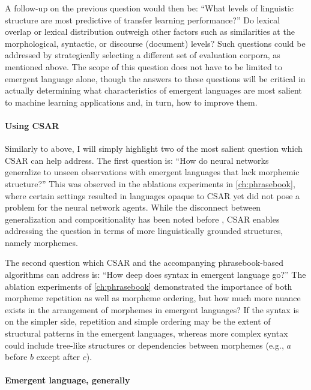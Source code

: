 A follow-up on the previous question would then be: ``What levels of linguistic structure are most predictive of transfer learning performance?''
Do lexical overlap or lexical distribution outweigh other factors such as similarities at the morphological, syntactic, or discourse (document) levels?
Such questions could be addressed by strategically selecting a different set of evaluation corpora, as mentioned above.
The scope of this question does not have to be limited to emergent language alone, though the answers to these questions will be critical in actually determining what characteristics of emergent languages are most salient to machine learning applications and, in turn, how to improve them.

\paragraph{Using CSAR}
Similarly to above, I will simply highlight two of the most salient question which CSAR can help address.
The first question is: ``How do neural networks generalize to unseen observations with emergent languages that lack morphemic structure?''
This was observed in the ablations experiments in \cref{ch:phrasebook}, where certain settings resulted in languages opaque to CSAR yet did not pose a problem for the neural network agents.
While the disconnect between generalization and compositionality has been noted before \citep{lake2018generalization}, CSAR enables addressing the question in terms of more linguistically grounded structures, namely morphemes.

The second question which CSAR and the accompanying phrasebook-based algorithms can address is: ``How deep does syntax in emergent language go?''
The ablation experiments of \cref{ch:phrasebook} demonstrated the importance of both morpheme repetition as well as morpheme ordering, but how much more nuance exists in the arrangement of morphemes in emergent languages?
If the syntax is on the simpler side, repetition and simple ordering may be the extent of structural patterns in the emergent languages, whereas more complex syntax could include tree-like structures or dependencies between morphemes (e.g., $a$ before $b$ except after $c$).

\paragraph{Emergent language, generally}

